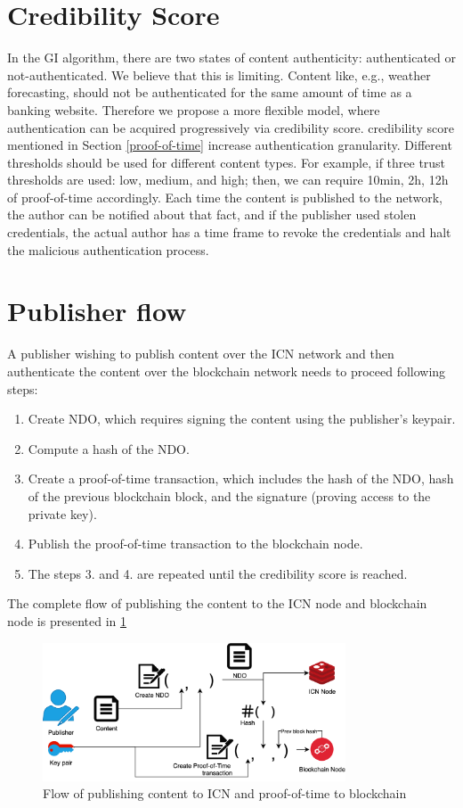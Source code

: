\section{Credibility Score}
\label{credibility-score}
In the GI algorithm, there are two states of content authenticity: authenticated or not-authenticated. We believe that this is limiting. Content like, e.g., weather forecasting, should not be authenticated for the same amount of time as a banking website. Therefore we propose a more flexible model, where authentication can be acquired progressively via credibility score. credibility score mentioned in Section \ref{proof-of-time} increase authentication granularity. Different thresholds should be used for different content types. For example, if three trust thresholds are used: low, medium, and high; then, we can require 10min, 2h, 12h of proof-of-time accordingly. Each time the content is published to the network, the author can be notified about that fact, and if the publisher used stolen credentials, the actual author has a time frame to revoke the credentials and halt the malicious authentication process.

\section{Publisher flow}
A publisher wishing to publish content over the ICN network and then authenticate the content over the blockchain network needs to proceed following steps:
\begin{enumerate}
    \item Create NDO, which requires signing the content using the publisher's keypair.
    \item Compute a hash of the NDO.
    \item Create a proof-of-time transaction, which includes the hash of the NDO, hash of the previous blockchain block, and the signature (proving access to the private key).
    \item Publish the proof-of-time transaction to the blockchain node.
    \item The steps 3. and 4. are repeated until the credibility score is reached.
\end{enumerate}
The complete flow of publishing the content to the ICN node and blockchain node is presented in \ref{fig:distribution-flow}
\begin{figure}[h!]
\includegraphics[width=9cm]{img/distribution-flow.png}
\centering
\caption{Flow of publishing content to ICN and proof-of-time to blockchain}
\label{fig:distribution-flow}
\end{figure} 

